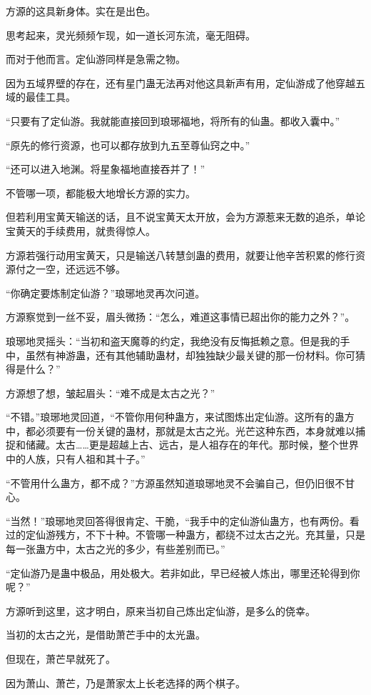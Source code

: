 \begin{this_body}
方源的这具新身体。实在是出色。

思考起来，灵光频频乍现，如一道长河东流，毫无阻碍。

而对于他而言。定仙游同样是急需之物。

因为五域界壁的存在，还有星门蛊无法再对他这具新声有用，定仙游成了他穿越五域的最佳工具。

“只要有了定仙游。我就能直接回到琅琊福地，将所有的仙蛊。都收入囊中。”

“原先的修行资源，也可以都存放到九五至尊仙窍之中。”

“还可以进入地渊。将星象福地直接吞并了！”

不管哪一项，都能极大地增长方源的实力。

但若利用宝黄天输送的话，且不说宝黄天太开放，会为方源惹来无数的追杀，单论宝黄天的手续费用，就贵得惊人。

方源若强行动用宝黄天，只是输送八转慧剑蛊的费用，就要让他辛苦积累的修行资源付之一空，还远远不够。

“你确定要炼制定仙游？”琅琊地灵再次问道。

方源察觉到一丝不妥，眉头微扬：“怎么，难道这事情已超出你的能力之外？”。

琅琊地灵摇头：“当初和盗天魔尊的约定，我绝没有反悔抵赖之意。但是我的手中，虽然有神游蛊，还有其他辅助蛊材，却独独缺少最关键的那一份材料。你可猜得是什么？”

方源想了想，皱起眉头：“难不成是太古之光？”

“不错。”琅琊地灵回道，“不管你用何种蛊方，来试图炼出定仙游。这所有的蛊方中，都必须要有一份关键的蛊材，那就是太古之光。光芒这种东西，本身就难以捕捉和储藏。太古……更是超越上古、远古，是人祖存在的年代。那时候，整个世界中的人族，只有人祖和其十子。”

“不管用什么蛊方，都不成？”方源虽然知道琅琊地灵不会骗自己，但仍旧很不甘心。

“当然！”琅琊地灵回答得很肯定、干脆，“我手中的定仙游仙蛊方，也有两份。看过的定仙游残方，不下十种。不管哪一种蛊方，都绕不过太古之光。充其量，只是每一张蛊方中，太古之光的多少，有些差别而已。”

“定仙游乃是蛊中极品，用处极大。若非如此，早已经被人炼出，哪里还轮得到你呢？”

方源听到这里，这才明白，原来当初自己炼出定仙游，是多么的侥幸。

当初的太古之光，是借助萧芒手中的太光蛊。

但现在，萧芒早就死了。

因为萧山、萧芒，乃是萧家太上长老选择的两个棋子。


\end{this_body}
